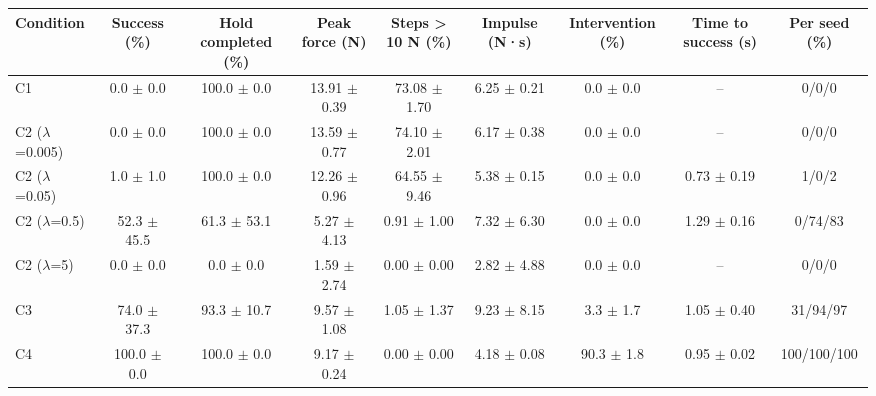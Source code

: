 \begin{tabular}{lcccccccc}
\toprule
Condition & Success (\%) & Hold completed (\%) & Peak force (N) & Steps > 10 N (\%) & Impulse (N·s) & Intervention (\%) & Time to success (s) & Per seed (\%) \\
\midrule
C1 & 0.0 $\pm$ 0.0 & 100.0 $\pm$ 0.0 & 13.91 $\pm$ 0.39 & 73.08 $\pm$ 1.70 & 6.25 $\pm$ 0.21 & 0.0 $\pm$ 0.0 & – & 0/0/0 \\
C2 ($\lambda$=0.005) & 0.0 $\pm$ 0.0 & 100.0 $\pm$ 0.0 & 13.59 $\pm$ 0.77 & 74.10 $\pm$ 2.01 & 6.17 $\pm$ 0.38 & 0.0 $\pm$ 0.0 & – & 0/0/0 \\
C2 ($\lambda$=0.05) & 1.0 $\pm$ 1.0 & 100.0 $\pm$ 0.0 & 12.26 $\pm$ 0.96 & 64.55 $\pm$ 9.46 & 5.38 $\pm$ 0.15 & 0.0 $\pm$ 0.0 & 0.73 $\pm$ 0.19 & 1/0/2 \\
C2 ($\lambda$=0.5) & 52.3 $\pm$ 45.5 & 61.3 $\pm$ 53.1 & 5.27 $\pm$ 4.13 & 0.91 $\pm$ 1.00 & 7.32 $\pm$ 6.30 & 0.0 $\pm$ 0.0 & 1.29 $\pm$ 0.16 & 0/74/83 \\
C2 ($\lambda$=5) & 0.0 $\pm$ 0.0 & 0.0 $\pm$ 0.0 & 1.59 $\pm$ 2.74 & 0.00 $\pm$ 0.00 & 2.82 $\pm$ 4.88 & 0.0 $\pm$ 0.0 & – & 0/0/0 \\
C3 & 74.0 $\pm$ 37.3 & 93.3 $\pm$ 10.7 & 9.57 $\pm$ 1.08 & 1.05 $\pm$ 1.37 & 9.23 $\pm$ 8.15 & 3.3 $\pm$ 1.7 & 1.05 $\pm$ 0.40 & 31/94/97 \\
C4 & 100.0 $\pm$ 0.0 & 100.0 $\pm$ 0.0 & 9.17 $\pm$ 0.24 & 0.00 $\pm$ 0.00 & 4.18 $\pm$ 0.08 & 90.3 $\pm$ 1.8 & 0.95 $\pm$ 0.02 & 100/100/100 \\
\bottomrule
\end{tabular}
